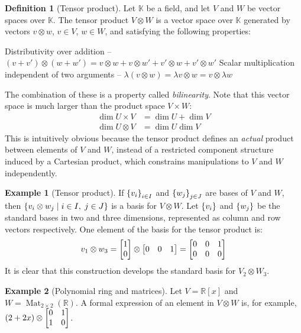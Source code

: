 \documentclass{article}
\theoremstyle{definition}
\newtheorem{Definition}{Definition}
\newtheorem*{Example*}{Example}
\theoremstyle{remark}
\DeclareMathOperator{\Mat}{Mat}
\begin{document}
\begin{Definition}[Tensor product]\label{def:TensorProd}
Let $\mathbb{K}$ be a field, and let $V$ and $W$ be vector spaces over $\mathbb{K}$. The tensor product $ V\otimes W $ is a vector space over $ \mathbb{K} $ generated by vectors $v \otimes w$, $v \in V$, $w \in W$, and satisfying the following properties:
\begin{center}
	Distributivity over addition -- \hfill $ (v + v') \otimes (w + w') = v \otimes w + v \otimes w' + v' \otimes w + v' \otimes w'$
	Scalar multiplication independent of two arguments -- \hfill $ \lambda(v \otimes w) = \lambda v \otimes w = v \otimes \lambda w$
\end{center}
\end{Definition}

The combination of these is a property called \emph{bilinearity}. Note that this vector space is much larger than the product space $V \times W$:
\begin{align*}
\dim U \times V & = \dim U + \dim V\\
\dim U \otimes V & = \dim U \dim V
\end{align*}
This is intuitively obvious because the tensor product defines an \emph{actual} product between elements of $V$ and $W$, instead of a restricted component structure induced by a Cartesian product, which constrains manipulations to $V$ and $W$ independently.

\begin{Example*}[Tensor product]
If $ \qty{v_i}_{i \in I}$ and $ \qty{w_j}_{j \in J} $ are bases of $V$ and $W$, then $ \qty{v_i \otimes w_j \mid i \in I, \; j \in J}$ is a basis for $V \otimes W$. Let $ \qty{v_i}$ and $\qty{w_j} $ be the standard bases in two and three dimensions, represented as column and row vectors respectively. One element of the basis for the tensor product is:
\begin{gather*}
	v_1 \otimes w_3 = \mqty[1 \\ 0] \otimes \mqty[0 & 0 & 1]  = \mqty[0 & 0 & 1 \\ 0 & 0 & 0]
\end{gather*}
It is clear that this construction develops the standard basis for $V_{2} \otimes W_{3}$.
\end{Example*}

\begin{Example*}[Polynomial ring and matrices] Let $ V = \mathbb{R}[x]$ and $ W = \Mat_{2\times 2}(\mathbb{R})$. A formal expression of an element in $V \otimes W $ is, for example, $(2 + 2x) \otimes \mqty[0 & 1 \\ 1 & 0]$.
\end{Example*}
\end{document}
